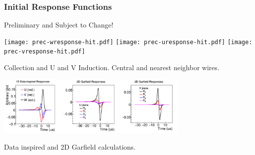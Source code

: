 \documentclass[xcolor=dvipsnames]{beamer}
\begin{document}
\begin{frame}
  \frametitle{Initial Response Functions}
  
  \footnotesize

  \begin{center}
    Preliminary and Subject to Change!

    \texttt{[image: prec-wresponse-hit.pdf]}%
    \texttt{[image: prec-uresponse-hit.pdf]}%
    \texttt{[image: prec-vresponse-hit.pdf]}

    Collection and U and V Induction.  Central and nearest neighbor wires.

    \includegraphics[width=0.7\textwidth]{overall_response.png}

    Data inspired and 2D Garfield calculations.
  \end{center}

\end{frame}
\end{document}
